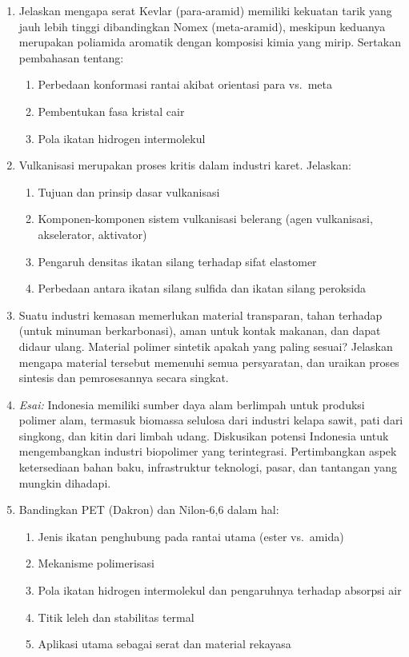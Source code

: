 \documentclass[12pt,a4paper,openany]{book}
\begin{document}
\begin{enumerate}
\item Jelaskan mengapa serat Kevlar (para-aramid) memiliki kekuatan tarik yang jauh lebih tinggi dibandingkan Nomex (meta-aramid), meskipun keduanya merupakan poliamida aromatik dengan komposisi kimia yang mirip. Sertakan pembahasan tentang:
\begin{enumerate}[label=(\alph*)]
\item Perbedaan konformasi rantai akibat orientasi para vs.\ meta
\item Pembentukan fasa kristal cair
\item Pola ikatan hidrogen intermolekul
\end{enumerate}

\item Vulkanisasi merupakan proses kritis dalam industri karet. Jelaskan:
\begin{enumerate}[label=(\alph*)]
\item Tujuan dan prinsip dasar vulkanisasi
\item Komponen-komponen sistem vulkanisasi belerang (agen vulkanisasi, akselerator, aktivator)
\item Pengaruh densitas ikatan silang terhadap sifat elastomer
\item Perbedaan antara ikatan silang sulfida dan ikatan silang peroksida
\end{enumerate}

\item Suatu industri kemasan memerlukan material transparan, tahan terhadap  (untuk minuman berkarbonasi), aman untuk kontak makanan, dan dapat didaur ulang. Material polimer sintetik apakah yang paling sesuai? Jelaskan mengapa material tersebut memenuhi semua persyaratan, dan uraikan proses sintesis dan pemrosesannya secara singkat.

\item \textit{Esai:} Indonesia memiliki sumber daya alam berlimpah untuk produksi polimer alam, termasuk biomassa selulosa dari industri kelapa sawit, pati dari singkong, dan kitin dari limbah udang. Diskusikan potensi Indonesia untuk mengembangkan industri biopolimer yang terintegrasi. Pertimbangkan aspek ketersediaan bahan baku, infrastruktur teknologi, pasar, dan tantangan yang mungkin dihadapi.

\item Bandingkan PET (Dakron) dan Nilon-6,6 dalam hal:
\begin{enumerate}[label=(\alph*)]
\item Jenis ikatan penghubung pada rantai utama (ester vs.\ amida)
\item Mekanisme polimerisasi
\item Pola ikatan hidrogen intermolekul dan pengaruhnya terhadap absorpsi air
\item Titik leleh dan stabilitas termal
\item Aplikasi utama sebagai serat dan material rekayasa
\end{enumerate}

\end{enumerate}
\end{document}
